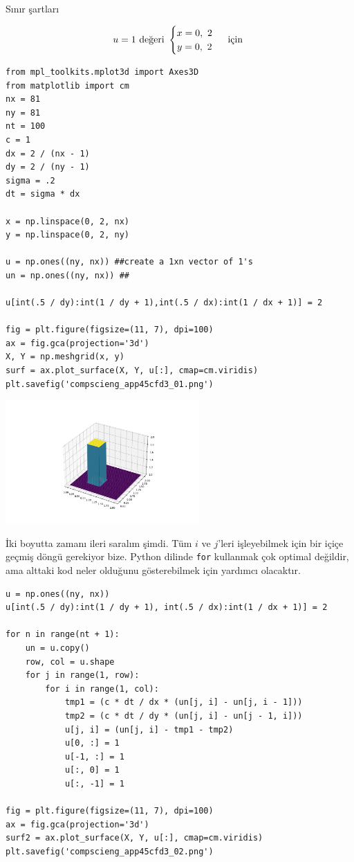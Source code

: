 \documentclass[12pt,fleqn]{article}\usepackage{../../common}
\begin{document}
Sınır şartları

$$
u = 1\ \text{değeri } \begin{cases}
\begin{matrix}
x =  0,\ 2 \cr
y =  0,\ 2 \end{matrix}\end{cases}
\text{ için }
$$

\begin{verbatim}
from mpl_toolkits.mplot3d import Axes3D    
from matplotlib import cm
nx = 81
ny = 81
nt = 100
c = 1
dx = 2 / (nx - 1)
dy = 2 / (ny - 1)
sigma = .2
dt = sigma * dx

x = np.linspace(0, 2, nx)
y = np.linspace(0, 2, ny)

u = np.ones((ny, nx)) ##create a 1xn vector of 1's
un = np.ones((ny, nx)) ##

u[int(.5 / dy):int(1 / dy + 1),int(.5 / dx):int(1 / dx + 1)] = 2 

fig = plt.figure(figsize=(11, 7), dpi=100)
ax = fig.gca(projection='3d')                      
X, Y = np.meshgrid(x, y)                            
surf = ax.plot_surface(X, Y, u[:], cmap=cm.viridis)
plt.savefig('compscieng_app45cfd3_01.png')
\end{verbatim}

\includegraphics[width=20em]{compscieng_app45cfd3_01.png}

İki boyutta zamanı ileri saralım şimdi. Tüm $i$ ve $j$'leri işleyebilmek için
bir içiçe geçmiş döngü gerekiyor bize. Python dilinde \verb!for! kullanmak çok
optimal değildir, ama alttaki kod neler olduğunu gösterebilmek için yardımcı
olacaktır.


\begin{verbatim}
u = np.ones((ny, nx))
u[int(.5 / dy):int(1 / dy + 1), int(.5 / dx):int(1 / dx + 1)] = 2

for n in range(nt + 1): 
    un = u.copy()
    row, col = u.shape
    for j in range(1, row):
        for i in range(1, col):
            tmp1 = (c * dt / dx * (un[j, i] - un[j, i - 1]))
            tmp2 = (c * dt / dy * (un[j, i] - un[j - 1, i]))
            u[j, i] = (un[j, i] - tmp1 - tmp2)
            u[0, :] = 1
            u[-1, :] = 1
            u[:, 0] = 1
            u[:, -1] = 1

fig = plt.figure(figsize=(11, 7), dpi=100)
ax = fig.gca(projection='3d')
surf2 = ax.plot_surface(X, Y, u[:], cmap=cm.viridis)
plt.savefig('compscieng_app45cfd3_02.png')
\end{verbatim}
\end{document}
